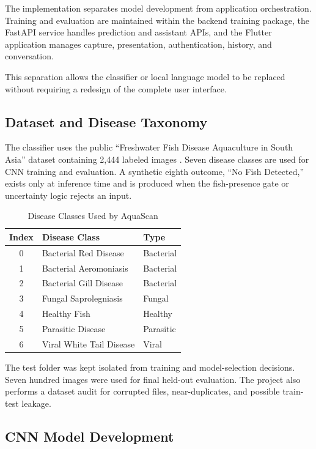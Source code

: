 \documentclass[conference]{IEEEtran}
\begin{document}
The implementation separates model development from application orchestration. Training and evaluation are maintained within the backend training package, the FastAPI service \cite{b15} handles prediction and assistant APIs, and the Flutter application \cite{b14} manages capture, presentation, authentication, history, and conversation.

This separation allows the classifier or local language model to be replaced without requiring a redesign of the complete user interface.

\subsection{Dataset and Disease Taxonomy}

The classifier uses the public ``Freshwater Fish Disease Aquaculture in South Asia'' dataset containing 2,444 labeled images \cite{b2}. Seven disease classes are used for CNN training and evaluation. A synthetic eighth outcome, ``No Fish Detected,'' exists only at inference time and is produced when the fish-presence gate or uncertainty logic rejects an input.

\begin{table}[!t]
\caption{Disease Classes Used by AquaScan}
\centering
\scriptsize
\begin{tabular}{c l l}
\toprule
\textbf{Index} & \textbf{Disease Class} & \textbf{Type}\\
\midrule
0 & Bacterial Red Disease & Bacterial\\
1 & Bacterial Aeromoniasis & Bacterial\\
2 & Bacterial Gill Disease & Bacterial\\
3 & Fungal Saprolegniasis & Fungal\\
4 & Healthy Fish & Healthy\\
5 & Parasitic Disease & Parasitic\\
6 & Viral White Tail Disease & Viral\\
\bottomrule
\end{tabular}
\label{tab:diseaseclasses}
\end{table}

The test folder was kept isolated from training and model-selection decisions. Seven hundred images were used for final held-out evaluation. The project also performs a dataset audit for corrupted files, near-duplicates, and possible train-test leakage.

\subsection{CNN Model Development}
\end{document}
